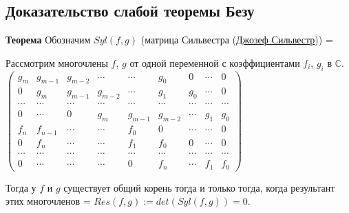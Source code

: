 \documentclass[a4paper, 12pt]{article}
\begin{document}
\subsection{Доказательство слабой теоремы Безу}

\textbf{Теорема}
\smallskip
Обозначим $Syl(f,g)$ (матрица Сильвестра (\href{https://ru.wikipedia.org/wiki/%D0%A1%D0%B8%D0%BB%D1%8C%D0%B2%D0%B5%D1%81%D1%82%D1%80,_%D0%94%D0%B6%D0%B5%D0%B9%D0%BC%D1%81_%D0%94%D0%B6%D0%BE%D0%B7%D0%B5%D1%84}{Джозеф Сильвестр})) =

Рассмотрим многочлены $f$, $g$ от одной переменной с коэффициентами $f_i$, $g_i$ в $\mathbb{C}$.
\smallskip
$\begin{pmatrix}
g_m & g_{m-1} & g_{m-2} & \cdots & \cdots & g_0 & 0 & \cdots & 0 \\
0 & g_m & g_{m-1} & g_{m-2} & \cdots & g_1 & g_0 & \cdots & 0 \\
\cdots & \cdots & \cdots & \cdots & \cdots & \cdots & \cdots & \cdots & \cdots \\
0 & \cdots & 0 & g_m & g_{m-1} & g_{m-2} & \cdots & g_1 & g_0 \\
f_n & f_{n-1} & \cdots & \cdots & f_0 & 0 & \cdots & \cdots & 0 \\
0 & f_n & \cdots & \cdots & f_1 & f_0 & 0 & \cdots & 0 \\
\cdots & \cdots & \cdots & \cdots & \cdots & \cdots & \cdots & \cdots & \cdots \\
0 & \cdots & \cdots & \cdots & 0 & f_n & \cdots & f_1 & f_0
\end{pmatrix}$
\smallskip

Тогда у $f$ и $g$ существует общий корень тогда и только тогда, когда результант этих многочленов = $Res(f,g) := det(Syl(f,g)) = 0$.
\bigskip
\end{document}
